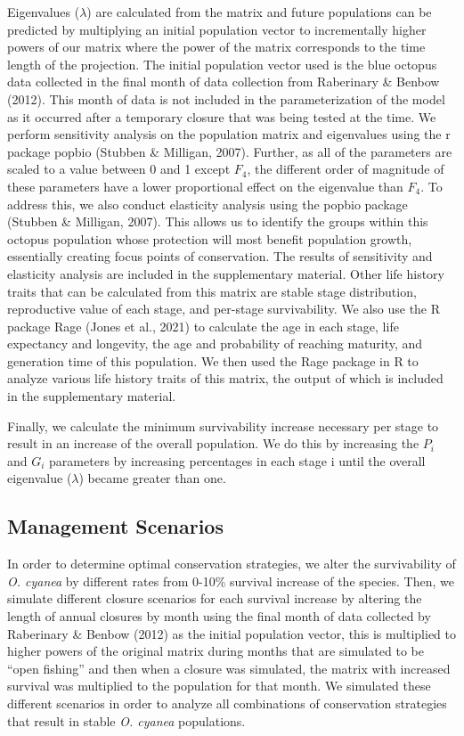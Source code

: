 \documentclass[
]{article}
\begin{document}
Eigenvalues (\(\lambda\)) are calculated from the matrix and future populations can be predicted by multiplying an initial population vector to incrementally higher powers of our matrix where the power of the matrix corresponds to the time length of the projection. The initial population vector used is the blue octopus data collected in the final month of data collection from Raberinary \& Benbow (2012). This month of data is not included in the parameterization of the model as it occurred after a temporary closure that was being tested at the time. We perform sensitivity analysis on the population matrix and eigenvalues using the r package popbio (Stubben \& Milligan, 2007). Further, as all of the parameters are scaled to a value between 0 and 1 except \(F_4\), the different order of magnitude of these parameters have a lower proportional effect on the eigenvalue than \(F_4\). To address this, we also conduct elasticity analysis using the popbio package (Stubben \& Milligan, 2007). This allows us to identify the groups within this octopus population whose protection will most benefit population growth, essentially creating focus points of conservation. The results of sensitivity and elasticity analysis are included in the supplementary material. Other life history traits that can be calculated from this matrix are stable stage distribution, reproductive value of each stage, and per-stage survivability. We also use the R package Rage (Jones et al., 2021) to calculate the age in each stage, life expectancy and longevity, the age and probability of reaching maturity, and generation time of this population. We then used the Rage package in R to analyze various life history traits of this matrix, the output of which is included in the supplementary material.

Finally, we calculate the minimum survivability increase necessary per stage to result in an increase of the overall population. We do this by increasing the \(P_i\) and \(G_i\) parameters by increasing percentages in each stage i until the overall eigenvalue (\(\lambda\)) became greater than one.

\hypertarget{management-scenarios}{%
\subsection{Management Scenarios}\label{management-scenarios}}

In order to determine optimal conservation strategies, we alter the survivability of \emph{O. cyanea} by different rates from 0-10\% survival increase of the species. Then, we simulate different closure scenarios for each survival increase by altering the length of annual closures by month using the final month of data collected by Raberinary \& Benbow (2012) as the initial population vector, this is multiplied to higher powers of the original matrix during months that are simulated to be ``open fishing'' and then when a closure was simulated, the matrix with increased survival was multiplied to the population for that month. We simulated these different scenarios in order to analyze all combinations of conservation strategies that result in stable \emph{O. cyanea} populations.
\end{document}
